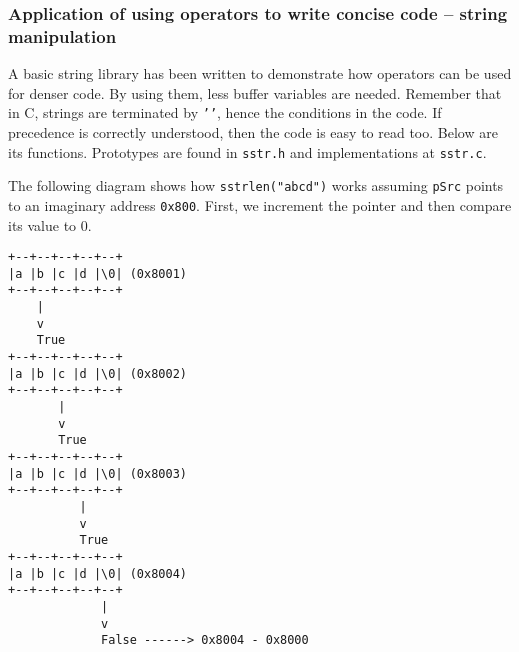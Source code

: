 \subsubsection{Application of using operators to write concise code -- string manipulation}

A basic string library has been written to demonstrate how operators can be used for denser code. By using them, less buffer variables are needed. Remember that in C, strings are terminated by \texttt{''}, hence the conditions in the code. If precedence is correctly understood, then the code is easy to read too. Below are its functions. Prototypes are found in \texttt{sstr.h} and implementations at \texttt{sstr.c}.


The following diagram shows how \texttt{sstrlen("abcd")} works assuming \texttt{pSrc} points to an imaginary address \texttt{0x800}. First, we increment the pointer and then compare its value to 0.
\begin{verbatim}
+--+--+--+--+--+
|a |b |c |d |\0| (0x8001)
+--+--+--+--+--+
    |
    v
    True     
+--+--+--+--+--+
|a |b |c |d |\0| (0x8002)
+--+--+--+--+--+
       | 
       v
       True     
+--+--+--+--+--+
|a |b |c |d |\0| (0x8003)
+--+--+--+--+--+
          | 
          v
          True
+--+--+--+--+--+
|a |b |c |d |\0| (0x8004)
+--+--+--+--+--+
             |
             v
             False ------> 0x8004 - 0x8000
\end{verbatim}





















